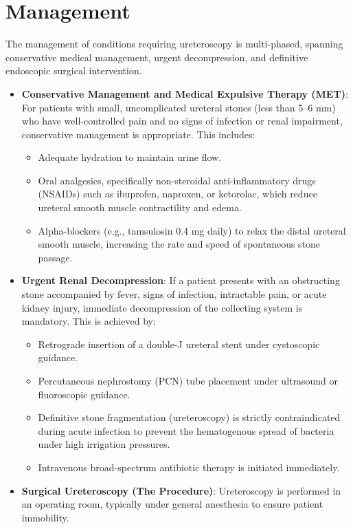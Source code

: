 \section*{Management}
The management of conditions requiring ureteroscopy is multi-phased, spanning conservative medical management, urgent decompression, and definitive endoscopic surgical intervention.
\begin{itemize}
\item \textbf{Conservative Management and Medical Expulsive Therapy (MET)}: For patients with small, uncomplicated ureteral stones (less than 5--6 mm) who have well-controlled pain and no signs of infection or renal impairment, conservative management is appropriate. This includes:
  \begin{itemize}
  \item Adequate hydration to maintain urine flow.
  \item Oral analgesics, specifically non-steroidal anti-inflammatory drugs (NSAIDs) such as ibuprofen, naproxen, or ketorolac, which reduce ureteral smooth muscle contractility and edema.
  \item Alpha-blockers (e.g., tamsulosin 0.4 mg daily) to relax the distal ureteral smooth muscle, increasing the rate and speed of spontaneous stone passage.
  \end{itemize}
\item \textbf{Urgent Renal Decompression}: If a patient presents with an obstructing stone accompanied by fever, signs of infection, intractable pain, or acute kidney injury, immediate decompression of the collecting system is mandatory. This is achieved by:
  \begin{itemize}
  \item Retrograde insertion of a double-J ureteral stent under cystoscopic guidance.
  \item Percutaneous nephrostomy (PCN) tube placement under ultrasound or fluoroscopic guidance.
  \item Definitive stone fragmentation (ureteroscopy) is strictly contraindicated during acute infection to prevent the hematogenous spread of bacteria under high irrigation pressures.
  \item Intravenous broad-spectrum antibiotic therapy is initiated immediately.
  \end{itemize}
\item \textbf{Surgical Ureteroscopy (The Procedure)}: Ureteroscopy is performed in an operating room, typically under general anesthesia to ensure patient immobility.

\end{itemize}
